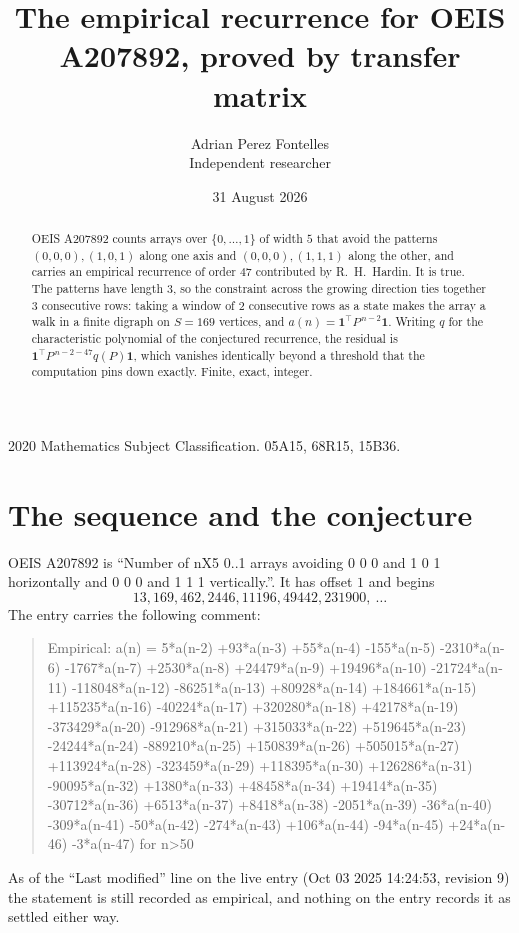 \documentclass[11pt,a4paper]{article}
\title{The empirical recurrence for OEIS A207892, proved by transfer matrix}
\author{Adrian Perez Fontelles\\ \small Independent researcher}
\date{31 August 2026}
\theoremstyle{plain}
\theoremstyle{definition}
\begin{document}
\maketitle

\begin{abstract}
OEIS A207892 counts arrays over $\{0,\dots,1\}$ of width $5$ that avoid the patterns
$(0,0,0), (1,0,1)$ along one axis and $(0,0,0), (1,1,1)$ along the other, and carries an empirical recurrence of
order $47$ contributed by R.~H.~Hardin. It is true. The patterns have length $3$, so
the constraint across the growing direction ties together $3$ consecutive rows: taking a
window of $2$ consecutive rows as a state makes the array a walk in a finite digraph
on $S=169$ vertices, and $a(n)=\mathbf{1}^{\!\top}P^{\,n-2}\mathbf{1}$. Writing $q$
for the characteristic polynomial of the conjectured recurrence, the residual is
$\mathbf{1}^{\!\top}P^{\,n-2-47}q(P)\mathbf{1}$, which vanishes identically
beyond a threshold that the computation pins down exactly. Finite, exact, integer.
\end{abstract}

\noindent\small 2020 Mathematics Subject Classification. 05A15, 68R15, 15B36.\normalsize

\section{The sequence and the conjecture}

OEIS A207892 is ``Number of nX5 0..1 arrays avoiding 0 0 0 and 1 0 1 horizontally and 0 0 0 and 1 1 1 vertically.''. It has offset
$1$ and begins
\[
13, 169, 462, 2446, 11196, 49442, 231900,\ \dots
\]
The entry carries the following comment:
\begin{quote}\small
Empirical: a(n) = 5*a(n-2) +93*a(n-3) +55*a(n-4) -155*a(n-5) -2310*a(n-6) -1767*a(n-7) +2530*a(n-8) +24479*a(n-9) +19496*a(n-10) -21724*a(n-11) -118048*a(n-12) -86251*a(n-13) +80928*a(n-14) +184661*a(n-15) +115235*a(n-16) -40224*a(n-17) +320280*a(n-18) +42178*a(n-19) -373429*a(n-20) -912968*a(n-21) +315033*a(n-22) +519645*a(n-23) -24244*a(n-24) -889210*a(n-25) +150839*a(n-26) +505015*a(n-27) +113924*a(n-28) -323459*a(n-29) +118395*a(n-30) +126286*a(n-31) -90095*a(n-32) +1380*a(n-33) +48458*a(n-34) +19414*a(n-35) -30712*a(n-36) +6513*a(n-37) +8418*a(n-38) -2051*a(n-39) -36*a(n-40) -309*a(n-41) -50*a(n-42) -274*a(n-43) +106*a(n-44) -94*a(n-45) +24*a(n-46) -3*a(n-47) for n>50
\end{quote}
As of the ``Last modified'' line on the live entry (Oct 03 2025 14:24:53, revision
9) the statement is still recorded as empirical, and nothing on the entry
records it as settled either way.
\end{document}
